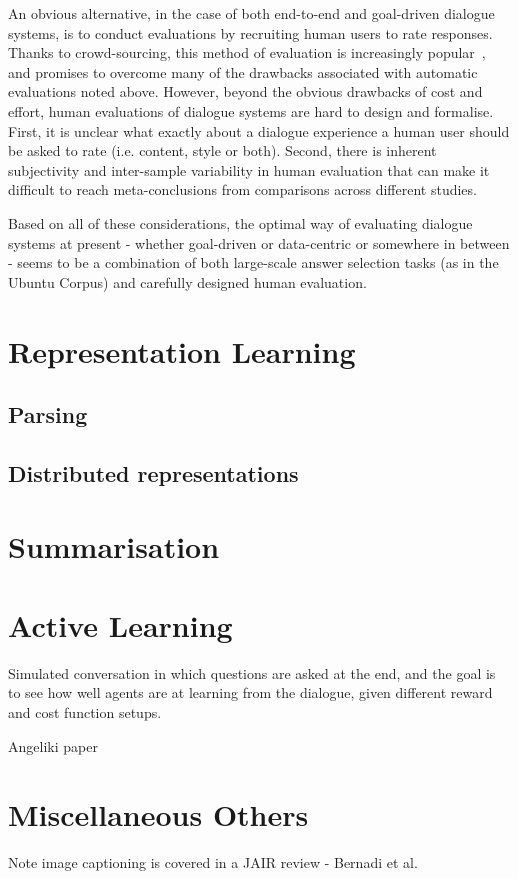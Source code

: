 \documentclass[11pt,letterpaper]{article}
\begin{document}
An obvious alternative, in the case of both end-to-end and goal-driven dialogue systems, is to conduct evaluations by recruiting human users to rate responses. Thanks to crowd-sourcing, this method of evaluation is increasingly popular~\cite{serban2016hierarchical,wen2016network}, and promises to overcome many of the drawbacks associated with automatic evaluations noted above. However, beyond the obvious drawbacks of cost and effort, human evaluations of dialogue systems are hard to design and formalise. First, it is unclear what exactly about a dialogue experience a human user should be asked to rate (i.e. content, style or both). Second, there is inherent subjectivity and inter-sample variability in human evaluation that can make it difficult to reach meta-conclusions from comparisons across different studies. 

Based on all of these considerations, the optimal way of evaluating dialogue systems at present - whether goal-driven or data-centric or somewhere in between - seems to be a  combination of both large-scale answer selection tasks (as in the Ubuntu Corpus) and carefully designed human evaluation.  


\section{Representation Learning}
\subsection{Parsing}
\subsection{Distributed representations}

\section{Summarisation}

\section{Active Learning}

\cite{weston2016dialog} Simulated conversation in which questions are asked at the end, and the goal is to see how well agents are at learning from the dialogue, given different reward and cost function setups. 

Angeliki paper

\cite{li2016deep} %

\section{Miscellaneous Others}

Note image captioning is covered in a JAIR review - Bernadi et al. 










\end{document}
